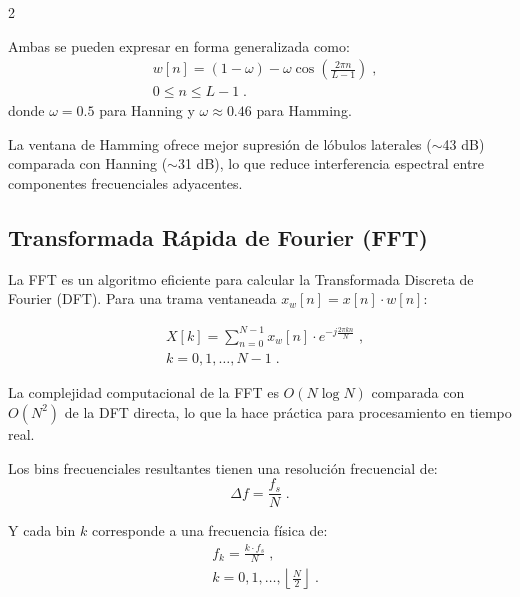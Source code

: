 \documentclass[12pt]{report}
\newenvironment{tightmulticols}{%
  \begin{multicols}{2}
  \setlength{\parskip}{1.2pt}
  \linespread{1}\selectfont
}{%
  \end{multicols}
}
\begin{document}
\begin{tightmulticols}
\noindent Ambas se pueden expresar en forma generalizada como:
\begin{equation*}
    \begin{split}
        &w[n] = (1-\omega) - \omega \cos\left(\frac{2\pi n}{L-1}\right) \; , \\[0.6ex]
        &0 \leq n \leq L-1 \; .
    \end{split}
\end{equation*}
donde $\omega = 0.5$ para Hanning y $\omega \approx 0.46$ para Hamming.

\par La ventana de Hamming ofrece mejor supresión de lóbulos laterales ($\sim$43 dB) comparada con Hanning ($\sim$31 dB), lo que reduce interferencia espectral entre componentes frecuenciales adyacentes.

\subsection{Transformada Rápida de Fourier (FFT)}

\noindent La FFT es un algoritmo eficiente para calcular la Transformada Discreta de Fourier (DFT). Para una trama ventaneada $x_w[n] = x[n] \cdot w[n]$:

\begin{equation*}
    \begin{split}
        &X[k] = \sum_{n=0}^{N-1} x_w[n] \cdot e^{-j\frac{2\pi kn}{N}} \; , \\[0.6ex]
        &k = 0, 1, \ldots, N-1 \; .
    \end{split}
\end{equation*}

\par La complejidad computacional de la FFT es $O(N \log N)$ comparada con $O(N^2)$ de la DFT directa, lo que la hace práctica para procesamiento en tiempo real.

\par Los bins frecuenciales resultantes tienen una resolución frecuencial de:
\begin{equation*}
    \Delta f = \frac{f_s}{N} \; .
\end{equation*}

\noindent Y cada bin $k$ corresponde a una frecuencia física de:
\begin{equation*}
    \begin{split}
        &f_k = \frac{k \cdot f_s}{N} \; , \\[0.6ex]
        &k = 0, 1, \ldots, \left\lfloor\frac{N}{2}\right\rfloor \; .
    \end{split}
\end{equation*}


\end{tightmulticols}
\end{document}
